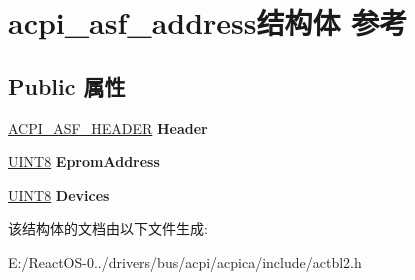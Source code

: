 \hypertarget{structacpi__asf__address}{}\section{acpi\+\_\+asf\+\_\+address结构体 参考}
\label{structacpi__asf__address}
\subsection*{Public 属性}
\begin{DoxyCompactItemize}
\item 
\mbox{\label{structacpi__asf__address_ae5f9c882c2b058464f0f61299bf315b9}} 
\hyperlink{structacpi__asf__header}{A\+C\+P\+I\+\_\+\+A\+S\+F\+\_\+\+H\+E\+A\+D\+ER} {\bfseries Header}
\item 
\mbox{\label{structacpi__asf__address_a1142c2256cf7f77f493bc96d471d74cc}} 
\hyperlink{_processor_bind_8h_ab27e9918b538ce9d8ca692479b375b6a}{U\+I\+N\+T8} {\bfseries Eprom\+Address}
\item 
\mbox{\label{structacpi__asf__address_a19acd54a87d835c9be0e8940ac17c38b}} 
\hyperlink{_processor_bind_8h_ab27e9918b538ce9d8ca692479b375b6a}{U\+I\+N\+T8} {\bfseries Devices}
\end{DoxyCompactItemize}


该结构体的文档由以下文件生成\+:\begin{DoxyCompactItemize}
\item 
E\+:/\+React\+O\+S-\/0../drivers/bus/acpi/acpica/include/actbl2.\+h\end{DoxyCompactItemize}
